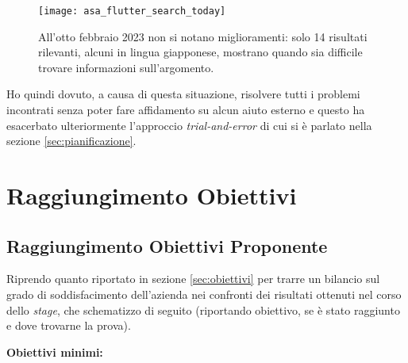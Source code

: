 \begin{figure}[H]
  \centering
  \texttt{[image: asa\_flutter\_search\_today]}
  \caption[Ricerca esatta Flutter e ASA 8 febbraio]{All'otto febbraio 2023 non si notano miglioramenti: solo 14 risultati rilevanti, alcuni in lingua giapponese, mostrano quando sia difficile trovare informazioni sull'argomento.}
  \label{fig:search2}
\end{figure}

Ho quindi dovuto, a causa di questa situazione, risolvere tutti i problemi incontrati senza poter fare affidamento su alcun aiuto esterno e questo ha esacerbato ulteriormente l'approccio \textit{trial-and-error} di cui si è parlato nella sezione \ref{sec:pianificazione}.


\section{Raggiungimento Obiettivi}
\subsection{Raggiungimento Obiettivi Proponente}
Riprendo quanto riportato in sezione \ref{sec:obiettivi} per trarre un bilancio sul grado di soddisfacimento dell'azienda nei confronti dei risultati ottenuti nel corso dello \textit{stage}, che schematizzo di seguito (riportando obiettivo, se è stato raggiunto e dove trovarne la prova).

\aCapo{}
\textbf{Obiettivi minimi:}

